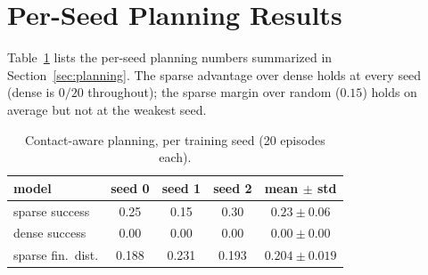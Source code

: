 \documentclass[conference]{IEEEtran}
\begin{document}
\section{Per-Seed Planning Results}\label{app:planseed}
Table~\ref{tab:planseed} lists the per-seed planning numbers summarized in
Section~\ref{sec:planning}. The sparse advantage over dense holds at every seed
(dense is $0/20$ throughout); the sparse margin over random ($0.15$) holds on average
but not at the weakest seed.

\begin{table}[h]
\caption{Contact-aware planning, per training seed (20 episodes each).}
\label{tab:planseed}
\centering \footnotesize \setlength{\tabcolsep}{6pt}
\begin{tabular}{@{}lcccc@{}}
\toprule
model & seed 0 & seed 1 & seed 2 & mean $\pm$ std \\
\midrule
sparse success & 0.25 & 0.15 & 0.30 & $0.23 \pm 0.06$ \\
dense success  & 0.00 & 0.00 & 0.00 & $0.00 \pm 0.00$ \\
sparse fin.\ dist. & 0.188 & 0.231 & 0.193 & $0.204 \pm 0.019$ \\
\bottomrule
\end{tabular}
\end{table}

\fi
\end{document}
